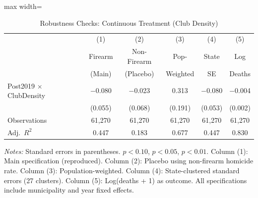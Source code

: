 \begin{table}[t]
\centering
\caption{Robustness Checks: Continuous Treatment (Club Density)}
\label{tab:robustness_results}
\begin{adjustbox}{max width=\textwidth}
\begin{tabular}{lccccc}
\toprule
 & (1) & (2) & (3) & (4) & (5) \\
 & Firearm & Non-Firearm & Pop- & State & Log \\
 & (Main) & (Placebo) & Weighted & SE & Deaths \\
\midrule
Post2019 $\times$ ClubDensity & $-$0.080 & $-$0.023 & 0.313 & $-$0.080 & $-$0.004\sym{*} \\
 & (0.055) & (0.068) & (0.191) & (0.053) & (0.002) \\
\midrule
Observations & 61,270 & 61,270 & 61,270 & 61,270 & 61,270 \\
Adj.\ $R^2$ & 0.447 & 0.183 & 0.677 & 0.447 & 0.830 \\
\bottomrule
\end{tabular}
\end{adjustbox}
\begin{flushleft}\small
\textit{Notes:} Standard errors in parentheses. \sym{*} $p<0.10$, \sym{**} $p<0.05$, \sym{***} $p<0.01$. Column (1): Main specification (reproduced). Column (2): Placebo using non-firearm homicide rate. Column (3): Population-weighted. Column (4): State-clustered standard errors (27 clusters). Column (5): Log(deaths + 1) as outcome. All specifications include municipality and year fixed effects.
\end{flushleft}
\end{table}
